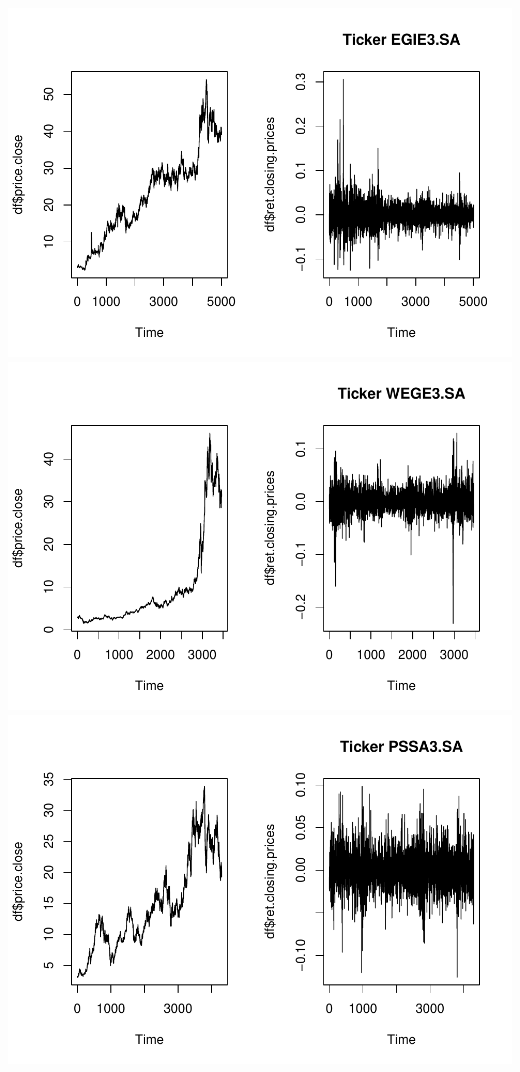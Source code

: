 \documentclass[
]{article}
\begin{document}
\includegraphics{work_files/figure-latex/unnamed-chunk-3-4.pdf}
\includegraphics{work_files/figure-latex/unnamed-chunk-3-5.pdf}
\includegraphics{work_files/figure-latex/unnamed-chunk-3-6.pdf}
\end{document}
